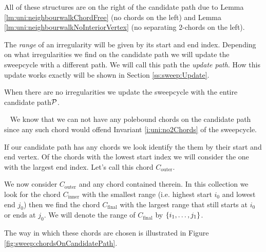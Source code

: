     All of these structures are on the right of the candidate path due to Lemma \ref{lm:uni:neighbourwalkChordFree} (no chords on the left) and Lemma \ref{lm:uni:neighbourwalkNoInteriorVertex} (no separating 2-chords on the left).

    The \emph{range} of an irregularity will be given by its start and end index. Depending on what irregularities we find on the candidate path we will update the sweepcycle with a different path. We will call this path the \emph{update path}. How this update works exactly will be shown in Section \ref{ss:sweep:Update}.

      When there are no irregularities we update the sweepcycle with the entire candidate path$\P$.

     \mbox{ }
    We know that we can not have any polebound chords on the candidate path since any such chord would offend Invariant \ref{i:uni:no2Chords} of the sweepcycle.

    If our candidate path has any chords we look identify the them by their start and end vertex. Of the chords with the lowest start index we will consider the one with the largest end index. Let's call this chord $C_\text{outer}$.

    We now consider $C_\text{outer}$ and any chord contained therein. In this collection we look for the chord $C_\text{inner}$ with the smallest range (i.e. highest start $i_0$ and lowest end $j_0$) then we find the chord $C_\text{final}$ with the largest range that still starts at $i_0$ or ends at $j_0$. We will denote the range of $C_\text{final}$ by $\braces{i_1, \ldots, j_1}$.

    The way in which these chords are chosen is illustrated in Figure \ref{fig:sweep:chordsOnCandidatePath}.

